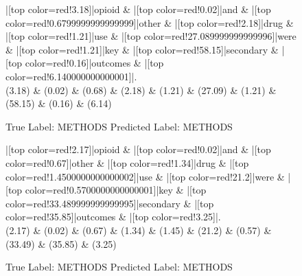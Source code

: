 \documentclass[a4paper, landscape]{article}
\begin{document}
\clearpage
\begin{figure}
\begin{center}
\begin{dependency}
\begin{deptext}
|[top color=red!3.18]|opioid \& |[top color=red!0.02]|and \& |[top color=red!0.6799999999999999]|other \& |[top color=red!2.18]|drug \& |[top color=red!1.21]|use \& |[top color=red!27.089999999999996]|were \& |[top color=red!1.21]|key \& |[top color=red!58.15]|secondary \& |[top color=red!0.16]|outcomes \& |[top color=red!6.140000000000001]|.\\
(3.18) \& (0.02) \& (0.68) \& (2.18) \& (1.21) \& (27.09) \& (1.21) \& (58.15) \& (0.16) \& (6.14)\\
\end{deptext}
\end{dependency}
\end{center}
\caption{True Label: METHODS Predicted Label: METHODS}
\end{figure}
\clearpage
\begin{figure}
\begin{center}
\begin{dependency}
\begin{deptext}
|[top color=red!2.17]|opioid \& |[top color=red!0.02]|and \& |[top color=red!0.67]|other \& |[top color=red!1.34]|drug \& |[top color=red!1.4500000000000002]|use \& |[top color=red!21.2]|were \& |[top color=red!0.5700000000000001]|key \& |[top color=red!33.489999999999995]|secondary \& |[top color=red!35.85]|outcomes \& |[top color=red!3.25]|.\\
(2.17) \& (0.02) \& (0.67) \& (1.34) \& (1.45) \& (21.2) \& (0.57) \& (33.49) \& (35.85) \& (3.25)\\
\end{deptext}
\end{dependency}
\end{center}
\caption{True Label: METHODS Predicted Label: METHODS}
\end{figure}
\end{document}
